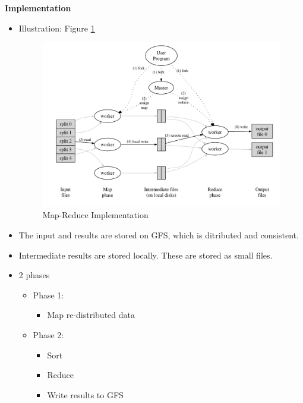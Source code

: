 \documentclass[parskip=half]{scrartcl}
\begin{document}
    \textbf{Implementation}
    \begin{itemize}
        \item 
        Illustration: Figure \ref{fig:mapreduce-implementation}
        \begin{figure}[ht]
            \centering
            \includegraphics[width=\textwidth]{mapreduce-implementation}
            \caption{Map-Reduce Implementation}
            \label{fig:mapreduce-implementation}
        \end{figure}
        \item 
        The input and results are stored on GFS, which is ditributed and consistent.
        \item 
        Intermediate results are stored locally. These are stored as small files.
        \item 
        2 phases
        \begin{itemize}
            \item 
            Phase 1:
            \begin{itemize}
                \item 
                Map re-distributed data
            \end{itemize}
            \item 
            Phase 2:
            \begin{itemize}
                \item 
                Sort
                \item 
                Reduce
                \item 
                Write results to GFS
            \end{itemize}
        \end{itemize}
    \end{itemize}
\end{document}

